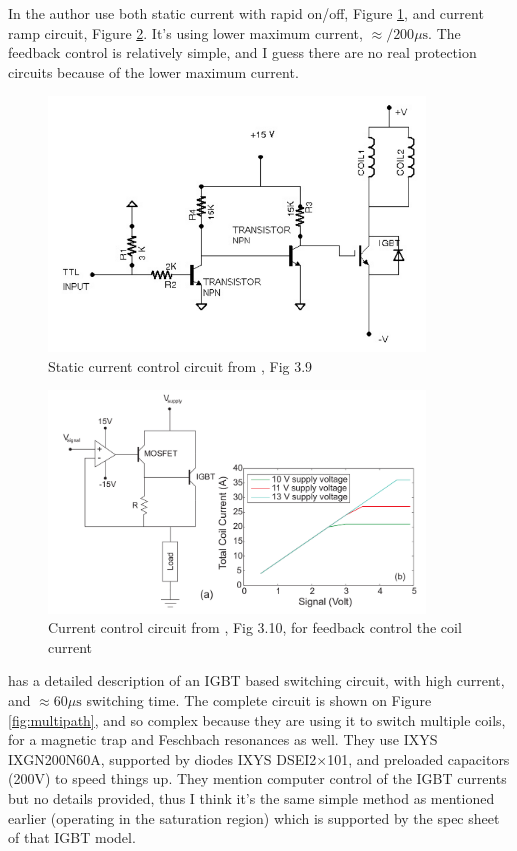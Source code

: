 \documentclass[12pt,a4paper]{article}
\begin{document}
In \citet{Palittapongarnpim2012} the author use both static current with rapid on/off, Figure \ref{fig:pstaticcircuit}, and current ramp circuit, Figure \ref{fig:pfeedbackcircuit}. It's using lower maximum current, $\approx/ 200 \mu \mathrm{s}$. The feedback control is relatively simple, and I guess there are no real protection circuits because of the lower maximum current.

\begin{figure}[ht!]
\centering
\includegraphics[width=100mm]{static_circuit.png}
\caption{Static current control circuit from \cite{Palittapongarnpim2012}, Fig 3.9}
\label{fig:pstaticcircuit}
\end{figure}

\begin{figure}[ht!]
\centering
\includegraphics[width=100mm]{current_control.png}
\caption{Current control circuit from \cite{Palittapongarnpim2012}, Fig 3.10, for feedback control the coil current}
\label{fig:pfeedbackcircuit}
\end{figure}

\citet{Dieckmann2001} has a detailed description of an IGBT based switching circuit, with high current, and $\approx 60 \mu \mathrm{s}$ switching time. The complete circuit is shown on Figure \ref{fig:multipath}, and so complex because they are using it to switch multiple coils, for a magnetic trap and Feschbach resonances as well. They use IXYS IXGN200N60A, supported by diodes IXYS DSEI2×101, and preloaded capacitors (200V) to speed things up. They mention computer control of the IGBT currents but no details provided, thus I think it's the same simple method as mentioned earlier (operating in the saturation region) which is supported by the spec sheet of that IGBT model.
\end{document}
